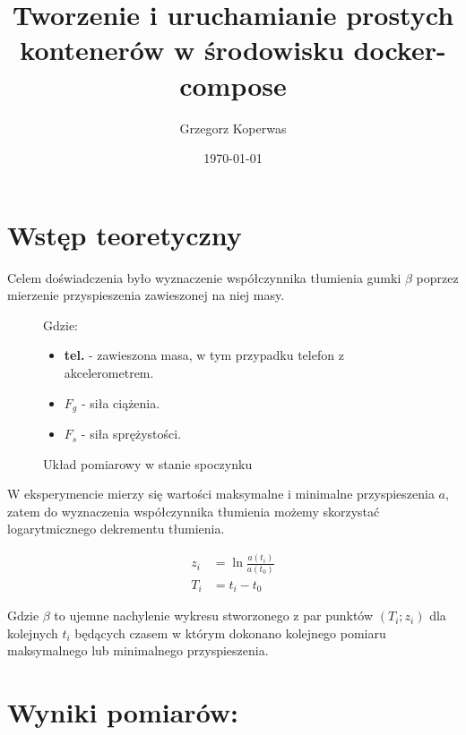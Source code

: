 \documentclass[a4paper,12pt]{article}
\title{Tworzenie i uruchamianie prostych kontenerów w środowisku  docker-compose}
\author{Grzegorz Koperwas}
\date{\today}
\begin{document}


\section{Wstęp teoretyczny}

Celem doświadczenia było wyznaczenie współczynnika tłumienia gumki $\beta$ poprzez mierzenie przyspieszenia zawieszonej na niej masy.

\begin{figure}[h]
	\centering
	\begin{flushleft}
		Gdzie:
		\begin{itemize}
			\item \textbf{tel.} - zawieszona masa, w tym przypadku telefon z akcelerometrem.
			\item $F_g$ - siła ciążenia.
			\item $F_s$ - siła sprężystości.
		\end{itemize}
	\end{flushleft}
	\caption{Układ pomiarowy w stanie spoczynku}
\end{figure}

W eksperymencie mierzy się wartości maksymalne i minimalne przyspieszenia $a$, zatem do wyznaczenia współczynnika tłumienia możemy skorzystać logarytmicznego dekrementu tłumienia.


\begin{align}
	z_i & = \ln \frac{a\left(t_i\right)}{a\left(t_0\right)} \\
	T_i & = t_i - t_0
\end{align}\label{eq:ziti}

Gdzie $\beta$ to ujemne nachylenie wykresu stworzonego z par punktów $\left(T_i; z_i\right)$ dla kolejnych $t_i$ będących czasem w którym dokonano kolejnego pomiaru maksymalnego lub minimalnego przyspieszenia.

\clearpage

\section{Wyniki pomiarów:}
\end{document}
